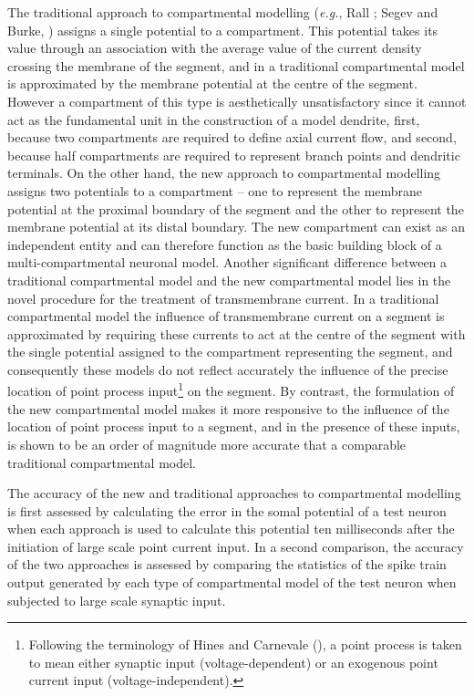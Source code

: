 The traditional approach to compartmental modelling (\emph{e.g.},
Rall \cite{Rall64}; Segev and Burke, \cite{Segev98}) assigns a
single potential to a compartment. This potential takes its value
through an association with the average value of the current
density crossing the membrane of the segment, and in a traditional
compartmental model is approximated by the membrane potential at
the centre of the segment. However a compartment of this type is
aesthetically unsatisfactory since it cannot act as the
fundamental unit in the construction of a model dendrite, first,
because two compartments are required to define axial current
flow, and second, because half compartments are required to
represent branch points and dendritic terminals. On the other
hand, the new approach to compartmental modelling assigns two
potentials to a compartment -- one to represent the membrane
potential at the proximal boundary of the segment and the other to
represent the membrane potential at its distal boundary. The new
compartment can exist as an independent entity and can therefore
function as the basic building block of a multi-compartmental
neuronal model. Another significant difference between a
traditional compartmental model and the new compartmental model
lies in the novel procedure for the treatment of transmembrane
current. In a traditional compartmental model the influence of
transmembrane current on a segment is approximated by requiring
these currents to act at the centre of the segment with the single
potential assigned to the compartment representing the segment,
and consequently these models do not reflect accurately the
influence of the precise location of point process
input\footnote{Following the terminology of Hines and Carnevale
(\cite{Hines97}), a point process is taken to mean either synaptic
input (voltage-dependent) or an exogenous point current input
(voltage-independent).} on the segment. By contrast, the
formulation of the new compartmental model makes it more
responsive to the influence of the location of point process input
to a segment, and in the presence of these inputs, is shown to be
an order of magnitude more accurate that a comparable traditional
compartmental model.

The accuracy of the new and traditional approaches to
compartmental modelling is first assessed by calculating the error
in the somal potential of a test neuron when each approach is used
to calculate this potential ten milliseconds after the initiation
of large scale point current input. In a second comparison, the
accuracy of the two approaches is assessed by comparing the
statistics of the spike train output generated by each type of
compartmental model of the test neuron when subjected to large
scale synaptic input.

